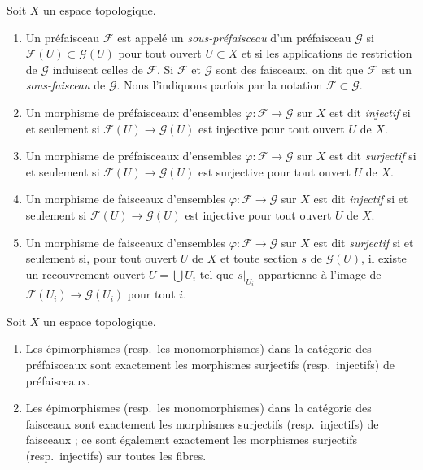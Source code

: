 \begin{definition}
\label{definition-injective-surjective}
Soit $X$ un espace topologique.
\begin{enumerate}
\item Un préfaisceau $\mathcal{F}$ est appelé un {\it sous-préfaisceau} d'un
préfaisceau $\mathcal{G}$ si
$\mathcal{F}(U) \subset \mathcal{G}(U)$ pour tout ouvert $U \subset X$ et
si les applications de restriction de $\mathcal{G}$ induisent celles de
$\mathcal{F}$. Si $\mathcal{F}$ et $\mathcal{G}$ sont des faisceaux, on dit
que $\mathcal{F}$ est un {\it sous-faisceau} de $\mathcal{G}$. Nous
l'indiquons parfois par la notation $\mathcal{F} \subset \mathcal{G}$.
\item Un morphisme de préfaisceaux d'ensembles
$\varphi : \mathcal{F} \to \mathcal{G}$ sur $X$ est dit {\it injectif} si
et seulement si $\mathcal{F}(U) \to \mathcal{G}(U)$ est injective pour tout
ouvert $U$ de $X$.
\item Un morphisme de préfaisceaux d'ensembles
$\varphi : \mathcal{F} \to \mathcal{G}$ sur $X$ est dit {\it surjectif} si
et seulement si $\mathcal{F}(U) \to \mathcal{G}(U)$ est surjective pour tout
ouvert $U$ de $X$.
\item Un morphisme de faisceaux d'ensembles
$\varphi : \mathcal{F} \to \mathcal{G}$ sur $X$ est dit {\it injectif} si
et seulement si $\mathcal{F}(U) \to \mathcal{G}(U)$ est injective pour tout
ouvert $U$ de $X$.
\item Un morphisme de faisceaux d'ensembles
$\varphi : \mathcal{F} \to \mathcal{G}$ sur $X$ est dit {\it surjectif} si
et seulement si, pour tout ouvert $U$ de $X$ et toute section $s$ de
$\mathcal{G}(U)$, il existe un recouvrement ouvert
$U = \bigcup U_i$ tel que $s|_{U_i}$ appartienne à l'image de
$\mathcal{F}(U_i) \to \mathcal{G}(U_i)$ pour tout $i$.
\end{enumerate}
\end{definition}


\begin{lemma}
\label{lemma-characterize-epi-mono}
Soit $X$ un espace topologique.
\begin{enumerate}
\item Les épimorphismes (resp.\ les monomorphismes) dans la catégorie des
préfaisceaux sont exactement les morphismes surjectifs (resp.\ injectifs) de
préfaisceaux.
\item Les épimorphismes (resp.\ les monomorphismes) dans la catégorie des
faisceaux sont exactement les morphismes surjectifs (resp.\ injectifs) de
faisceaux ; ce sont également exactement les morphismes surjectifs
(resp.\ injectifs) sur toutes les fibres.
\end{enumerate}
\end{lemma}

